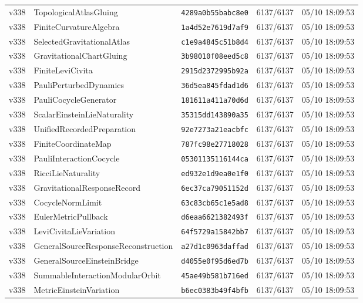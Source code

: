 \documentclass[11pt]{article}
\theoremstyle{definition}\newtheorem{deriv}{Derivação}
\begin{document}
{\begin{longtable}{@{}lllll@{}}
v338 & TopologicalAtlasGluing & \texttt{4289a0b55babc8e0} & 6137/6137 & 05/10 18:09:53 \\
v338 & FiniteCurvatureAlgebra & \texttt{1a4d52e7619d7af9} & 6137/6137 & 05/10 18:09:53 \\
v338 & SelectedGravitationalAtlas & \texttt{c1e9a4845c51b8d4} & 6137/6137 & 05/10 18:09:53 \\
v338 & GravitationalChartGluing & \texttt{3b98010f08eed5c8} & 6137/6137 & 05/10 18:09:53 \\
v338 & FiniteLeviCivita & \texttt{2915d2372995b92a} & 6137/6137 & 05/10 18:09:53 \\
v338 & PauliPerturbedDynamics & \texttt{36d5ea845fdad1d6} & 6137/6137 & 05/10 18:09:53 \\
v338 & PauliCocycleGenerator & \texttt{181611a411a70d6d} & 6137/6137 & 05/10 18:09:53 \\
v338 & ScalarEinsteinLieNaturality & \texttt{35315dd143890a35} & 6137/6137 & 05/10 18:09:53 \\
v338 & UnifiedRecordedPreparation & \texttt{92e7273a21eacbfc} & 6137/6137 & 05/10 18:09:53 \\
v338 & FiniteCoordinateMap & \texttt{787fc98e27718028} & 6137/6137 & 05/10 18:09:53 \\
v338 & PauliInteractionCocycle & \texttt{05301135116144ca} & 6137/6137 & 05/10 18:09:53 \\
v338 & RicciLieNaturality & \texttt{ed932e1d9ea0e1f0} & 6137/6137 & 05/10 18:09:53 \\
v338 & GravitationalResponseRecord & \texttt{6ec37ca79051152d} & 6137/6137 & 05/10 18:09:53 \\
v338 & CocycleNormLimit & \texttt{63c83cb65c1e5ad8} & 6137/6137 & 05/10 18:09:53 \\
v338 & EulerMetricPullback & \texttt{d6eaa6621382493f} & 6137/6137 & 05/10 18:09:53 \\
v338 & LeviCivitaLieVariation & \texttt{64f5729a15842bb7} & 6137/6137 & 05/10 18:09:53 \\
v338 & GeneralSourceResponseReconstruction & \texttt{a27d1c0963daffad} & 6137/6137 & 05/10 18:09:53 \\
v338 & GeneralSourceEinsteinBridge & \texttt{d4055e0f95d6ed7b} & 6137/6137 & 05/10 18:09:53 \\
v338 & SummableInteractionModularOrbit & \texttt{45ae49b581b716ed} & 6137/6137 & 05/10 18:09:53 \\
v338 & MetricEinsteinVariation & \texttt{b6ec0383b49f4bfb} & 6137/6137 & 05/10 18:09:53 \\

\end{longtable}}
\end{document}
